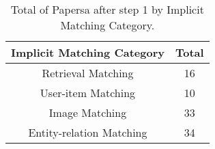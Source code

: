 \begin{table}[ht]
\centering
\begin{tabular}{|c|c|}
\hline
\textbf{Implicit Matching Category} & \textbf{Total} \\
\hline
Retrieval Matching & 16 \\
User-item Matching & 10 \\
Image Matching & 33 \\
Entity-relation Matching & 34 \\
\hline
\end{tabular}
\caption{Total of Papersa after step 1 by Implicit Matching Category.}
\label{tbl:old_types}
\end{table}
